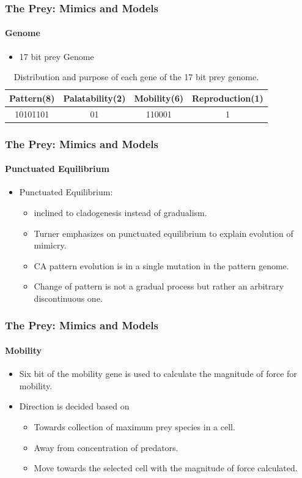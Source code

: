 \frame
{
	\frametitle{The Prey: Mimics and Models}
	\framesubtitle{Genome}
	
	\begin{itemize}
		\item 17 bit prey Genome
	\end{itemize}
	
	\begin{table}[H]
	\centering
	\begin{scriptsize}
	\begin{spacing}{1.5}
	\begin{tabular}{|c|c|c|c|}
		\hline
			\textbf{Pattern(8)} & \textbf{Palatability(2)} & \textbf{Mobility(6)} & \textbf{Reproduction(1)} \\ \hline
			10101101					 	& 							01		 		 & 			110001					&					1						 		 \\ \hline
	\end{tabular}
	\end{spacing}
	\end{scriptsize}
	\caption{Distribution and purpose of each gene of the 17 bit prey genome.}
	\label{tab:prey-genome}
	\end{table}
}

\frame
{
	\frametitle{The Prey: Mimics and Models}
	\framesubtitle{Punctuated Equilibrium}
	
	\begin{itemize}
		\item Punctuated Equilibrium:
			\begin{itemize}
				\item inclined to cladogenesis instead of gradualism.
				\item Turner emphasizes on punctuated equilibrium to explain evolution of mimicry.
				\item CA pattern evolution is in a single mutation in the pattern genome.
				\item Change of pattern is not a gradual process but rather an arbitrary discontinuous one.
			\end{itemize}
	\end{itemize}
}

\frame
{
	\frametitle{The Prey: Mimics and Models}
	\framesubtitle{Mobility}
	
	\begin{itemize}
		\item Six bit of the mobility gene is used to calculate the magnitude of force for mobility.
		\item Direction is decided based on 
			\begin{itemize}
				\item Towards collection of maximum prey species in a cell.
				\item Away from concentration of predators.
				\item Move towards the selected cell with the magnitude of force calculated.
			\end{itemize}
	\end{itemize}
}

